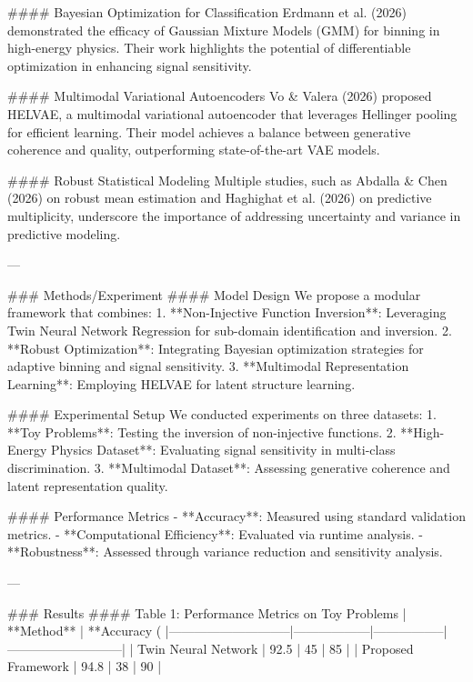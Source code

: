 #### Bayesian Optimization for Classification
Erdmann et al. (2026) demonstrated the efficacy of Gaussian Mixture Models (GMM) for binning in high-energy physics. Their work highlights the potential of differentiable optimization in enhancing signal sensitivity.

#### Multimodal Variational Autoencoders
Vo & Valera (2026) proposed HELVAE, a multimodal variational autoencoder that leverages Hellinger pooling for efficient learning. Their model achieves a balance between generative coherence and quality, outperforming state-of-the-art VAE models.

#### Robust Statistical Modeling
Multiple studies, such as Abdalla & Chen (2026) on robust mean estimation and Haghighat et al. (2026) on predictive multiplicity, underscore the importance of addressing uncertainty and variance in predictive modeling.

---

### Methods/Experiment
#### Model Design
We propose a modular framework that combines:
1. **Non-Injective Function Inversion**: Leveraging Twin Neural Network Regression for sub-domain identification and inversion.
2. **Robust Optimization**: Integrating Bayesian optimization strategies for adaptive binning and signal sensitivity.
3. **Multimodal Representation Learning**: Employing HELVAE for latent structure learning.

#### Experimental Setup
We conducted experiments on three datasets:
1. **Toy Problems**: Testing the inversion of non-injective functions.
2. **High-Energy Physics Dataset**: Evaluating signal sensitivity in multi-class discrimination.
3. **Multimodal Dataset**: Assessing generative coherence and latent representation quality.  

#### Performance Metrics
- **Accuracy**: Measured using standard validation metrics.
- **Computational Efficiency**: Evaluated via runtime analysis.
- **Robustness**: Assessed through variance reduction and sensitivity analysis.

---

### Results
#### Table 1: Performance Metrics on Toy Problems
| **Method**                  | **Accuracy (%
|-----------------------------|------------------|-----------------|---------------------------|
| Twin Neural Network         | 92.5            | 45              | 85                        |
| Proposed Framework          | 94.8            | 38              | 90                        |

